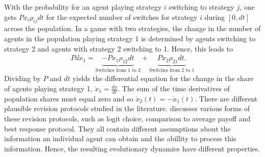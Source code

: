 With the probability for an agent playing strategy $i$ switching to strategy
$j$, one gets $P x_i \rho_{ij} dt$ for the expected number of 
switches for strategy $i$ during $[0,dt]$ across the population.   
In a game with two strategies, the change in the number 
of agents in the population playing strategy 1 is determined 
by agents switching to strategy 2 and agents with strategy 2 
switching to 1. Hence, this leads to
\begin{align} 
        Pdx_1 =  \underbrace{-Px_1 \rho_{12}dt}_{\text{Switches from 1 to 2}} 
        + \underbrace{Px_2 \rho_{21}dt.}_{\text{Switches from 2 to 1}}
\end{align}
Dividing by $P$ and $dt$ yields the differential equation for
the change in the share of agents playing strategy 1, 
$\dot{x}_1 =\frac{dx}{dt}$. 
The sum of the time derivatives of population shares must equal zero and so
$\dot{x}_2(t) =- \dot{x}_1(t)$.
There are different plausible revision protocols studied in the literature. 
\textcite{sandholm_population_2010} discusses various forms of 
these revision protocols, such as logit choice, comparison to average payoff 
and best response protocol. 
They all contain different assumptions about the information 
an individual agent can obtain and the abillity to process this information.
Hence, the resulting evolutionary dynamics have different properties.


